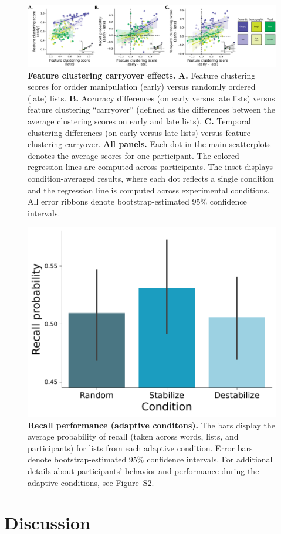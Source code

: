 \documentclass[11pt]{article}
\newcommand{\dynamicsAdaptive}{S2}
\begin{document}
\begin{figure}[tp] \centering
    \includegraphics[width=\textwidth]{figures/clustering_carryover}
    
    \caption{\textbf{Feature clustering carryover effects.} \textbf{A.} Feature
    clustering scores for ordder manipulation (early) versus randomly ordered
    (late) lists. \textbf{B.} Accuracy differences (on early versus late lists)
    versus feature clustering ``carryover'' (defined as the differences between
    the average clustering scores on early and late lists). \textbf{C.}
    Temporal clustering differences (on early versus late lists) versus feature
    clustering carryover. \textbf{All panels.} Each dot in the main
    scatterplots denotes the average scores for one participant. The colored
    regression lines are computed across participants. The inset displays
    condition-averaged results, where each dot reflects a single condition and
    the regression line is computed across experimental conditions. All error
    ribbons denote bootstrap-estimated 95\% confidence intervals.}
    \label{fig:clustering-carryover} 

\end{figure}

\begin{figure} 
    \centering

    \includegraphics[width=0.4 \textwidth]{figures/source/accuracy_adaptive}
        
        \caption{\textbf{Recall performance (adaptive conditons).} The bars
        display the average probability of recall (taken across words, lists,
        and participants) for lists from each adaptive condition. Error bars
        denote bootstrap-estimated 95\% confidence intervals. For additional
        details about participants' behavior and performance during the
        adaptive conditions, see Figure~\dynamicsAdaptive.}

    \label{fig:adaptive}
\end{figure}

\section*{Discussion}






\end{document}
